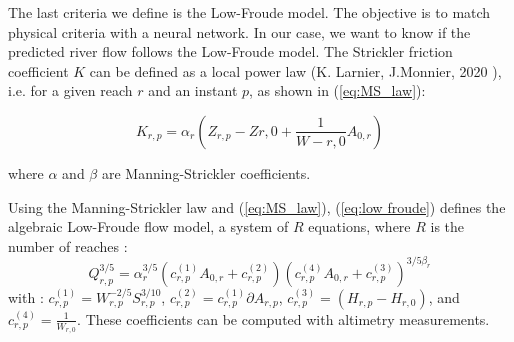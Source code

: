 The last criteria we define is the Low-Froude model. The objective is to match physical criteria with a neural network. In our case, we want to know if the predicted river flow follows the Low-Froude model. The Strickler friction coefficient $K$ can be defined as a local power law (K. Larnier, J.Monnier, 2020 \cite{larnier2020hybrid}), i.e. for a given reach $r$ and an instant $p$, as shown in (\ref{eq:MS_law}): 

\begin{equation}
    K_{r,p} = \alpha_r \left( Z_{r,p} - Z{r,0} + \frac{1}{W-{r,0}}A_{0,r}\right)
    \label{eq:MS_law}
\end{equation}

where $\alpha$ and $\beta$ are Manning-Strickler coefficients.\newline

Using the Manning-Strickler law and (\ref{eq:MS_law}), (\ref{eq:low froude}) defines the algebraic Low-Froude flow model, a system of $R$ equations, where $R$ is the number of reaches : 
\begin{equation}
    Q^{3/5}_{r,p} = \alpha_r^{3/5} ( c_{r,p}^{(1)} A_{0,r} + c_{r,p}^{(2)})(c_{r,p}^{(4)}A_{0,r} + c_{r,p}^{(3)})^{3/5\beta_r}
    \label{eq:low froude}
\end{equation}
with : $ c_{r,p}^{(1)} = W_{r,p}^{-2/5}S_{r,p}^{3/10}$, $ c_{r,p}^{(2)} = c_{r,p}^{(1)} \partial A_{r,p}$, $ c_{r,p}^{(3)} = (H_{r,p} - H_{r,0})$, and  $ c_{r,p}^{(4)} = \frac{1}{W_{r,0}}$. These coefficients can be computed with altimetry measurements. 